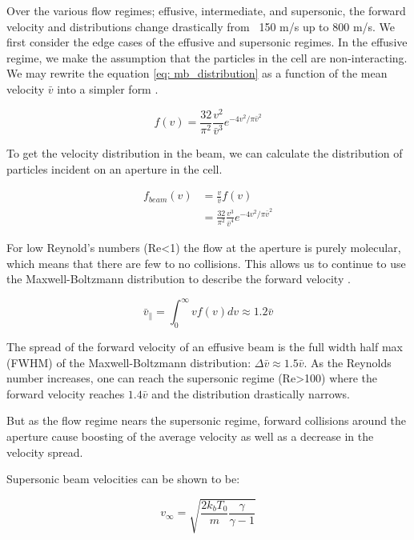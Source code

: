 Over the various flow regimes; effusive, intermediate, and supersonic, the forward velocity and distributions change drastically from ~150 m/s up to 800 m/s. We first consider the edge cases of the effusive and supersonic regimes. In the effusive regime, we make the assumption that the particles in the cell are non-interacting. We may rewrite the equation \ref{eq: mb_distribution} as a function of the mean velocity $\bar{v}$ into a simpler form .

\begin{equation}
	f(v) = \frac{32}{\pi^2} \frac{v^2}{\bar{v}^3} e^{-4v^2/\pi \bar{v}^2} \label{eq: mb_simplified}
\end{equation}

To get the velocity distribution in the beam, we can calculate the distribution of particles incident on an aperture in the cell.

\begin{align*}
	f_{beam}(v) & = \frac{v}{\bar{v}}f(v)  \\
	& = \frac{32}{\pi^2} \frac{v^3}{\bar{v}^4} e^{-4v^2/\pi \bar{v}^2}
\end{align*}

For low Reynold's numbers (Re<1) the flow at the aperture is purely molecular, which means that there are few to no collisions. This allows us to continue to use the Maxwell-Boltzmann distribution to describe the forward velocity \cite{Hutzler2011c}.

\begin{equation}
	\bar{v}_\parallel = \int_0^\infty v f(v) dv \approx 1.2 \bar{v}
\end{equation}

The spread of the forward velocity of an effusive beam is the full width half max (FWHM) of the Maxwell-Boltzmann distribution: $\Delta\bar{v} \approx 1.5 \bar{v}$. As the Reynolds number increases, one can reach the supersonic regime (Re>100) where the forward velocity reaches $1.4\bar{v}$ and the distribution drastically narrows.\cite{Hutzler2011c,Pauly}

But as the flow regime nears the supersonic regime, forward collisions around the aperture cause boosting of the average velocity as well as a decrease in the velocity spread. 

Supersonic beam velocities can be shown to be:\cite{Pauly}

\begin{equation*}
	v_\infty = \sqrt{\frac{2 k_b T_0}{m}\frac{\gamma}{\gamma - 1}}
\end{equation*}


